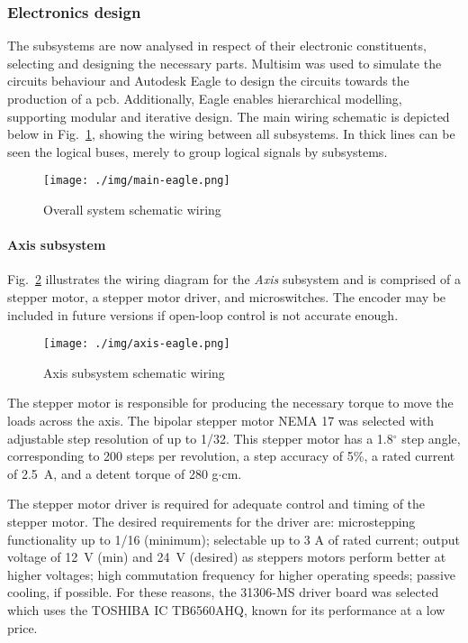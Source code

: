 \subsubsection{Electronics design}%
\label{sec:electronics-design}
The subsystems are now analysed in respect of their electronic constituents,
selecting and designing the necessary parts. Multisim was used to simulate the
circuits behaviour and Autodesk Eagle to design the circuits towards the
production of a \gls{pcb}. Additionally, Eagle enables hierarchical modelling,
supporting modular and iterative design. The main wiring schematic is depicted below in
Fig.~\ref{fig:main-wiring}, showing the wiring between all subsystems. In thick
lines can be seen the logical buses, merely to group logical signals by subsystems.

\begin{figure}[!hbt]
  \centering
  \texttt{[image: ./img/main-eagle.png]}
  \caption{Overall system schematic wiring}%
  \label{fig:main-wiring}
\end{figure}

\paragraph{Axis subsystem}
Fig.~\ref{fig:axis-wiring} illustrates the wiring diagram for the \emph{Axis}
subsystem and is
comprised of a stepper motor, a stepper motor driver, and microswitches. The
encoder may be included in future versions if open-loop control is not accurate enough.

\begin{figure}[!hbt]
  \centering
  \texttt{[image: ./img/axis-eagle.png]}
  \caption{Axis subsystem schematic wiring}%
  \label{fig:axis-wiring}
\end{figure}

The stepper motor is responsible for producing the necessary torque to move the
loads across the axis. The bipolar stepper motor NEMA 17 was selected with
adjustable step resolution of up to 1/32. This stepper motor has a 1.8$^{\circ}$ step angle, corresponding to 200 steps
per revolution, a step accuracy of 5\%, a rated current of 2.5~A, and a detent
torque of 280 g$\cdot$cm.

The stepper motor driver is required for
adequate control and timing of the stepper motor. The desired requirements for
the driver are: microstepping functionality up to 1/16 (minimum); selectable up to
3 A of rated current; output voltage of 12~V (min) and 24~V (desired) as steppers
motors perform better at higher voltages; high commutation frequency for higher
operating speeds; passive cooling, if possible.
For these reasons, the 31306-MS driver board
was selected which uses the TOSHIBA IC TB6560AHQ, known for its performance at a low
price.

